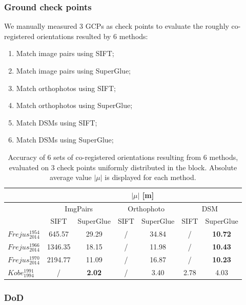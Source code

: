 \subsubsection{Ground check points}
We manually measured 3 GCPs as check points to evaluate the roughly co-registered orientations resulted by 6 methods:\\
\begin{enumerate}
	\item Match image pairs using SIFT;
	\item Match image pairs using SuperGlue;
	\item Match orthophotos using SIFT;
	\item Match orthophotos using SuperGlue;
	\item Match DSMs using SIFT;
	\item Match DSMs using SuperGlue;
\end{enumerate}

\begin{table}%
	\footnotesize
	\centering
	\begin{tabular}{|l|c|c|c|c|c|c|}\hline
		&\multicolumn{6}{c|}{$|\mu|$ [m]}\\\hline
		&\multicolumn{2}{c|}{ImgPairs} &\multicolumn{2}{c|}{Orthophoto} &\multicolumn{2}{c|}{DSM}\\\hline
		& SIFT & SuperGlue & SIFT & SuperGlue & SIFT & SuperGlue \\\hline\hline
		$Frejus_{2014}^{1954}$ & 645.57 & 29.29 & / & 34.84 & / & \textbf{10.72}\\\hline
		$Frejus_{2014}^{1966}$ & 1346.35 & 18.15 & / & 11.98 & / & \textbf{10.43}\\\hline
		$Frejus_{2014}^{1970}$ & 2194.77 & 11.09 & / & 16.87 & / & \textbf{10.23}\\\hline\hline
		$Kobe_{1994}^{1991}$ & / & \textbf{2.02} & / & 3.40 & 2.78 & 4.03 \\\hline
\end{tabular}
	\caption{Accuracy of 6 sets of co-registered orientations resulting from 6 methods, evaluated on 3 check points uniformly distributed in the block. Absolute average value $|\mu|$ is displayed for each method.}
	\label{CheckptAcuracy}
\end{table}

\subsubsection{DoD}


